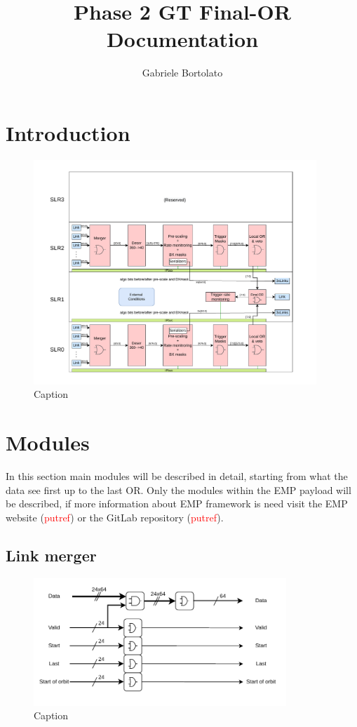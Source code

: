\documentclass[a4paper,11pt]{article}
\title{Phase 2 GT Final-OR Documentation}
\author{Gabriele Bortolato}
\begin{document}
\maketitle

\section{Introduction}
\begin{figure}[h]
    \centering
    \includegraphics[width=0.95\textwidth]{Images/Finor_layout_SLR201.pdf}
    \caption{Caption}
    \label{fig:Finor_overview}
\end{figure}

\section{Modules}

In this section main modules will be described in detail, starting from what the data see first up to the last OR. Only the modules within the EMP payload will be described, if more information about EMP framework is need visit the EMP website (\textcolor{red}{putref}) or the GitLab repository (\textcolor{red}{putref}).   

\subsection{Link merger}

\begin{figure}[h]
    \centering
    \includegraphics[width=0.85\textwidth]{Images/Modules/Link_merger.pdf}
    \caption{Caption}
    \label{fig:Merger}
\end{figure}
\end{document}
